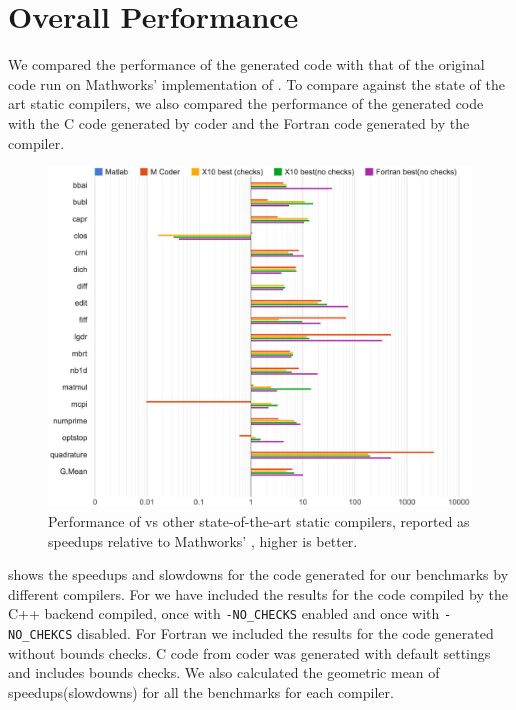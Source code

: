 \section{Overall \mixten Performance}

We compared the performance of the generated \xten code with that of the
original \matlab code run on Mathworks' implementation of \matlab.  To compare
against the state of the art static compilers, we also compared the performance
of the \mixten generated \xten code with the C code generated by \matlab coder
and the Fortran code generated by the \mctwofor compiler.

\begin{figure}[htbp] 
\begin{center}
\includegraphics[width=\linewidth]{Figures/final/overall_perf.pdf}
\caption{Performance of \mixten vs other state-of-the-art static
compilers, reported as speedups relative to Mathworks' \matlab,  higher
is better.} \label{Fig:overall_perf} 
\end{center} 
\end{figure} 

 shows the speedups and slowdowns for the code
generated for our benchmarks by different compilers.  For \mixten we have
included the results for the \xten code compiled by the \xten C++ backend
compiled, once with \texttt{-NO\_CHECKS} enabled and once with
\texttt{-NO\_CHEKCS} disabled.  For Fortran we included the results for the
code generated without bounds checks.  C code from \matlab coder was generated
with default settings and includes bounds checks. We also calculated the
geometric mean of speedups(slowdowns) for all the benchmarks for each compiler. 


